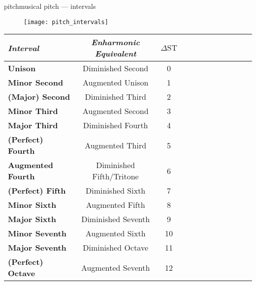         \begin{frame}{pitch}{musical pitch --- intervals}
            \vspace{-4mm}
            \begin{figure}
                \texttt{[image: pitch\_intervals]}
            \end{figure}

            \pause
            \vspace{-6mm}
            \begin{scriptsize}
                \begin{table}
                    \centering
                    \begin{tabular}{lccccccccccc} %
                        \\ \hline
                        \bf{\emph{Interval}}	 & \bf{\emph{Enharmonic Equivalent}}	 & \bf{\emph{$\Delta\mathrm{ST}$}}\\ 
                         \hline
                        \bf{Unison}	 & Diminished Second	 & 0\\
                        \bf{Minor Second}	 & Augmented Unison	 & 1\\
                        \bf{(Major) Second}	 & Diminished Third	 & 2\\
                        \bf{Minor Third}	 & Augmented Second	 & 3\\
                        \bf{Major Third}	 & Diminished Fourth	 & 4\\
                        \bf{(Perfect) Fourth}	 & Augmented Third	 & 5\\
                        \bf{Augmented Fourth}	 & Diminished Fifth/Tritone	 & 6\\
                        \bf{(Perfect) Fifth}	 & Diminished Sixth	 & 7\\
                        \bf{Minor Sixth}	 & Augmented Fifth	 & 8\\
                        \bf{Major Sixth}	 & Diminished Seventh	 & 9\\
                        \bf{Minor Seventh}	 & Augmented Sixth	 & 10\\
                        \bf{Major Seventh}	 & Diminished Octave	 & 11\\
                        \bf{(Perfect) Octave}	 & Augmented Seventh	 & 12\\
                    \end{tabular}
                \end{table}
            \end{scriptsize}
        \end{frame}
        
